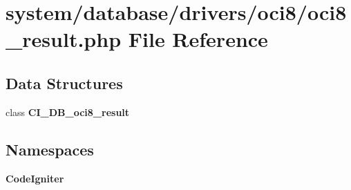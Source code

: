 \section{system/database/drivers/oci8/oci8\-\_\-result.php File Reference}
\label{oci8__result_8php}
\subsection*{Data Structures}
\begin{DoxyCompactItemize}
\item 
class {\bf C\-I\-\_\-\-D\-B\-\_\-oci8\-\_\-result}
\end{DoxyCompactItemize}
\subsection*{Namespaces}
\begin{DoxyCompactItemize}
\item 
{\bf Code\-Igniter}
\end{DoxyCompactItemize}
